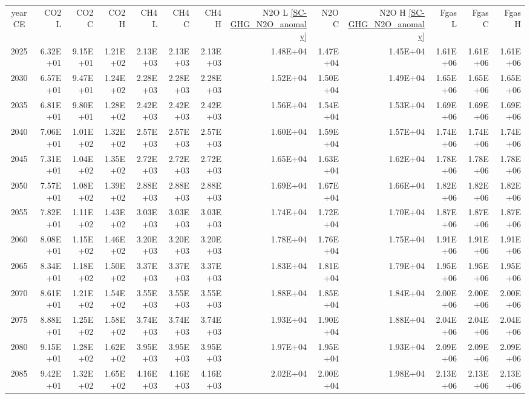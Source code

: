 \documentclass{article}
\begin{document}
\begin{table}
\begin{tabular}{crrr|rrr|rrr|rrr}
year CE  & CO2 L    & CO2 C    & CO2 H    & CH4 L    & CH4 C    & CH4 H    & N2O L \ref{SC-GHG_N2O_anomaly}     & N2O C      & N2O H \ref{SC-GHG_N2O_anomaly}    & Fgas L   & Fgas C   & Fgas H   \\
2025     & 6.32E+01 & 9.15E+01 & 1.21E+02 & 2.13E+03 & 2.13E+03 & 2.13E+03 & 1.48E+04 & 1.47E+04 & 1.45E+04 & 1.61E+06 & 1.61E+06 & 1.61E+06 \\
2030     & 6.57E+01 & 9.47E+01 & 1.24E+02 & 2.28E+03 & 2.28E+03 & 2.28E+03 & 1.52E+04 & 1.50E+04 & 1.49E+04 & 1.65E+06 & 1.65E+06 & 1.65E+06 \\
2035     & 6.81E+01 & 9.80E+01 & 1.28E+02 & 2.42E+03 & 2.42E+03 & 2.42E+03 & 1.56E+04 & 1.54E+04 & 1.53E+04 & 1.69E+06 & 1.69E+06 & 1.69E+06 \\
2040     & 7.06E+01 & 1.01E+02 & 1.32E+02 & 2.57E+03 & 2.57E+03 & 2.57E+03 & 1.60E+04 & 1.59E+04 & 1.57E+04 & 1.74E+06 & 1.74E+06 & 1.74E+06 \\
2045     & 7.31E+01 & 1.04E+02 & 1.35E+02 & 2.72E+03 & 2.72E+03 & 2.72E+03 & 1.65E+04 & 1.63E+04 & 1.62E+04 & 1.78E+06 & 1.78E+06 & 1.78E+06 \\
2050     & 7.57E+01 & 1.08E+02 & 1.39E+02 & 2.88E+03 & 2.88E+03 & 2.88E+03 & 1.69E+04 & 1.67E+04 & 1.66E+04 & 1.82E+06 & 1.82E+06 & 1.82E+06 \\
2055     & 7.82E+01 & 1.11E+02 & 1.43E+02 & 3.03E+03 & 3.03E+03 & 3.03E+03 & 1.74E+04 & 1.72E+04 & 1.70E+04 & 1.87E+06 & 1.87E+06 & 1.87E+06 \\
2060     & 8.08E+01 & 1.15E+02 & 1.46E+02 & 3.20E+03 & 3.20E+03 & 3.20E+03 & 1.78E+04 & 1.76E+04 & 1.75E+04 & 1.91E+06 & 1.91E+06 & 1.91E+06 \\
2065     & 8.34E+01 & 1.18E+02 & 1.50E+02 & 3.37E+03 & 3.37E+03 & 3.37E+03 & 1.83E+04 & 1.81E+04 & 1.79E+04 & 1.95E+06 & 1.95E+06 & 1.95E+06 \\
2070     & 8.61E+01 & 1.21E+02 & 1.54E+02 & 3.55E+03 & 3.55E+03 & 3.55E+03 & 1.88E+04 & 1.85E+04 & 1.84E+04 & 2.00E+06 & 2.00E+06 & 2.00E+06 \\
2075     & 8.88E+01 & 1.25E+02 & 1.58E+02 & 3.74E+03 & 3.74E+03 & 3.74E+03 & 1.93E+04 & 1.90E+04 & 1.88E+04 & 2.04E+06 & 2.04E+06 & 2.04E+06 \\
2080     & 9.15E+01 & 1.28E+02 & 1.62E+02 & 3.95E+03 & 3.95E+03 & 3.95E+03 & 1.97E+04 & 1.95E+04 & 1.93E+04 & 2.09E+06 & 2.09E+06 & 2.09E+06 \\
2085     & 9.42E+01 & 1.32E+02 & 1.65E+02 & 4.16E+03 & 4.16E+03 & 4.16E+03 & 2.02E+04 & 2.00E+04 & 1.98E+04 & 2.13E+06 & 2.13E+06 & 2.13E+06 \\

\end{tabular}
\end{table}
\end{document}
